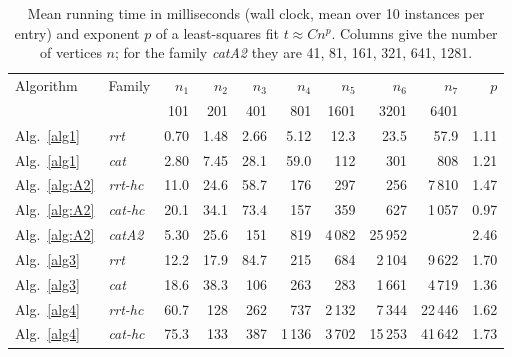 \begin{table}[htbp]
\centering
\small
\caption{Mean running time in milliseconds (wall clock, mean over 10 instances per entry) and exponent $p$ of a least-squares fit $t\approx C n^{p}$. Columns give the number of vertices $n$; for the family \emph{catA2} they are 41, 81, 161, 321, 641, 1281.}
\label{tab:runtimes}
\begin{tabular}{llrrrrrrrr}
\hline
Algorithm & Family & $n_{1}$ & $n_{2}$ & $n_{3}$ & $n_{4}$ & $n_{5}$ & $n_{6}$ & $n_{7}$ & $p$ \\
& & 101 & 201 & 401 & 801 & 1601 & 3201 & 6401 & \\
\hline
Alg.~\ref{alg1} & \emph{rrt} & 0.70 & 1.48 & 2.66 & 5.12 & 12.3 & 23.5 & 57.9 & 1.11 \\
Alg.~\ref{alg1} & \emph{cat} & 2.80 & 7.45 & 28.1 & 59.0 & 112 & 301 & 808 & 1.21 \\
Alg.~\ref{alg:A2} & \emph{rrt-hc} & 11.0 & 24.6 & 58.7 & 176 & 297 & 256 & 7\,810 & 1.47 \\
Alg.~\ref{alg:A2} & \emph{cat-hc} & 20.1 & 34.1 & 73.4 & 157 & 359 & 627 & 1\,057 & 0.97 \\
Alg.~\ref{alg:A2} & \emph{catA2} & 5.30 & 25.6 & 151 & 819 & 4\,082 & 25\,952 &  & 2.46 \\
Alg.~\ref{alg3} & \emph{rrt} & 12.2 & 17.9 & 84.7 & 215 & 684 & 2\,104 & 9\,622 & 1.70 \\
Alg.~\ref{alg3} & \emph{cat} & 18.6 & 38.3 & 106 & 263 & 283 & 1\,661 & 4\,719 & 1.36 \\
Alg.~\ref{alg4} & \emph{rrt-hc} & 60.7 & 128 & 262 & 737 & 2\,132 & 7\,344 & 22\,446 & 1.62 \\
Alg.~\ref{alg4} & \emph{cat-hc} & 75.3 & 133 & 387 & 1\,136 & 3\,702 & 15\,253 & 41\,642 & 1.73 \\
\hline
\end{tabular}
\end{table}
